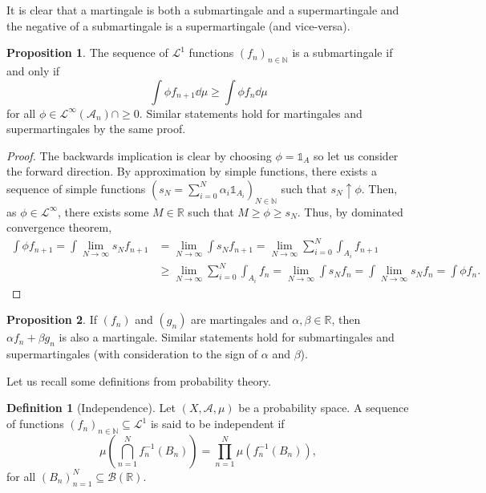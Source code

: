 \documentclass[]{article}
\theoremstyle{definition}
\theoremstyle{definition}
\newtheorem{definition}{Definition}
\newtheorem{proposition}{Proposition}[section]
\begin{document}
It is clear that a martingale is both a submartingale and a supermartingale and 
the negative of a submartingale is a supermartingale (and vice-versa).

\begin{proposition}
  The sequence of \(\mathcal{L}^1\) functions \((f_n)_{n \in \mathbb{N}}\) is a 
  submartingale if and only if 
  \[\int \phi f_{n + 1} \dd \mu \ge \int \phi f_n \dd \mu\]
  for all \(\phi \in \mathcal{L}^\infty(\mathcal{A}_n) \cap \ge 0\). 
  Similar statements hold for martingales and supermartingales by the same proof.
\end{proposition}
\begin{proof}
  The backwards implication is clear by choosing \(\phi = \mathbb{1}_A\) so 
  let us consider the forward direction. By approximation by simple functions, 
  there exists a sequence of simple functions 
  \(\left(s_N = \sum_{i = 0}^N \alpha_i \mathbb{1}_{A_i}\right)_{N \in \mathbb{N}}\) 
  such that \(s_N \uparrow \phi\). Then, as \(\phi \in \mathcal{L}^\infty\), 
  there exists some \(M \in \mathbb{R}\) such that \(M \ge \phi \ge s_N\). 
  Thus, by dominated convergence theorem, 
  \[\begin{split}
    \int \phi f_{n + 1} = \int \lim_{N \to \infty} s_N f_{n + 1} 
    & = \lim_{N \to \infty} \int s_N f_{n + 1} 
      = \lim_{N \to \infty} \sum_{i = 0}^N \int_{A_i} f_{n + 1}\\
    & \ge \lim_{N \to \infty} \sum_{i = 0}^N \int_{A_i} f_n 
      = \lim_{N \to \infty} \int s_N f_n = \int \lim_{N \to \infty} s_N f_n 
      = \int \phi f_n.
    \end{split}\] 
\end{proof}

\begin{proposition}
  If \((f_n)\) and \((g_n)\) are martingales and \(\alpha, \beta \in \mathbb{R}\),
  then \(\alpha f_n + \beta g_n\) is also a martingale. Similar statements 
  hold for submartingales and supermartingales (with consideration to the  
  sign of \(\alpha\) and \(\beta\)).
\end{proposition}

Let us recall some definitions from probability theory.

\begin{definition}[Independence]
  Let \((X, \mathcal{A}, \mu)\) be a probability space. A sequence of 
  functions \((f_n)_{n \in \mathbb{N}} \subseteq \mathcal{L}^1\) is said to be 
  independent if 
  \[\mu\left(\bigcap_{n = 1}^N f_n^{-1}(B_n)\right) = 
    \prod_{n = 1}^N\mu(f_n^{-1}(B_n)),\]
  for all \((B_n)_{n = 1}^N \subseteq \mathcal{B}(\mathbb{R})\).
\end{definition}
\end{document}
